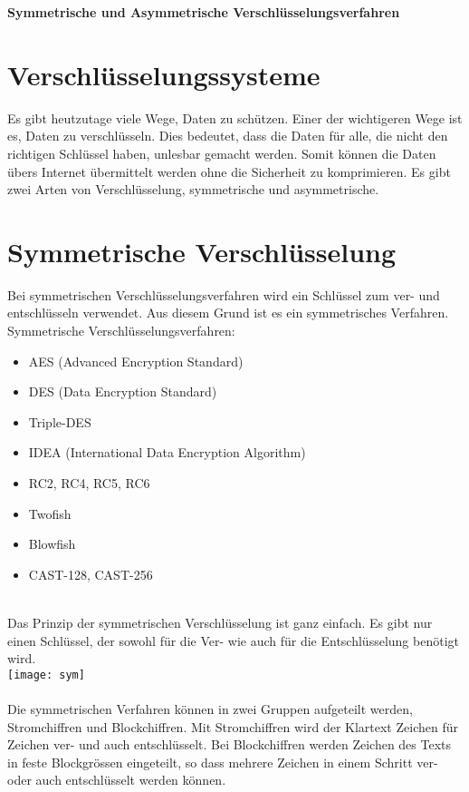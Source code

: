 \documentclass{article}
\begin{document}
\Large \textbf{Symmetrische und Asymmetrische Verschlüsselungsverfahren} \normalsize
\section*{Verschlüsselungssysteme}

Es gibt heutzutage viele Wege, Daten zu schützen. Einer der wichtigeren Wege ist es, Daten zu verschlüsseln. Dies bedeutet, dass die Daten für alle, die nicht den richtigen Schlüssel haben, unlesbar gemacht werden. Somit können die Daten übers Internet übermittelt werden ohne die Sicherheit zu komprimieren. Es gibt zwei Arten von Verschlüsselung, symmetrische und asymmetrische.

\section*{Symmetrische Verschlüsselung}
Bei symmetrischen Verschlüsselungsverfahren wird ein Schlüssel  zum ver- und entschlüsseln verwendet. Aus diesem Grund ist es ein symmetrisches Verfahren.\\

Symmetrische Verschlüsselungsverfahren:

\begin{itemize}
    \item AES (Advanced Encryption Standard)
    \item DES (Data Encryption Standard)
    \item Triple-DES
    \item IDEA (International Data Encryption Algorithm)
    \item RC2, RC4, RC5, RC6
    \item Twofish
    \item Blowfish
    \item CAST-128, CAST-256
\end{itemize} \cite{1} \\

Das Prinzip der symmetrischen Verschlüsselung ist ganz einfach. Es gibt nur einen Schlüssel, der sowohl für die Ver- wie auch für die Entschlüsselung benötigt wird. \\
\texttt{[image: sym]} \\
\cite{3}
\\

Die symmetrischen Verfahren können in zwei Gruppen aufgeteilt werden, Stromchiffren und Blockchiffren. Mit Stromchiffren wird der Klartext Zeichen für Zeichen ver- und auch entschlüsselt. Bei Blockchiffren werden Zeichen des Texts in feste Blockgrössen eingeteilt, so dass mehrere Zeichen in einem Schritt ver- oder auch entschlüsselt werden können. \\
\end{document}
